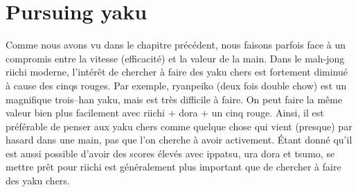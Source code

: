 
\chapter{Pursuing yaku} \label{ch:yaku}
\thispagestyle{empty}

\bigskip
Comme nous avons vu dans le chapitre précédent, nous faisons parfois face à un compromis entre la vitesse (efficacité) et la valeur de la main. Dans le mah-jong riichi moderne, l'intérêt de chercher à faire des {\jap yaku} chers est fortement diminué à cause des cinqs rouges.
Par exemple, {\jap ryanpeiko} (deux fois double chow) est un magnifique trois--{\jap han yaku}, mais est très difficile à faire. On peut faire la même valeur bien plus facilement avec riichi + {\jap dora} + un cinq rouge. Ainsi, il est préférable de penser aux {\jap yaku} chers comme quelque chose qui vient (presque) par hasard dans une main, pas que l'on cherche à avoir activement.
\'Etant donné qu'il est aussi possible d'avoir des scores élevés avec {\jap ippatsu}, {\jap ura dora} et {\jap tsumo}, se mettre prêt pour riichi est généralement plus important que de chercher à faire des {\jap yaku} chers.

